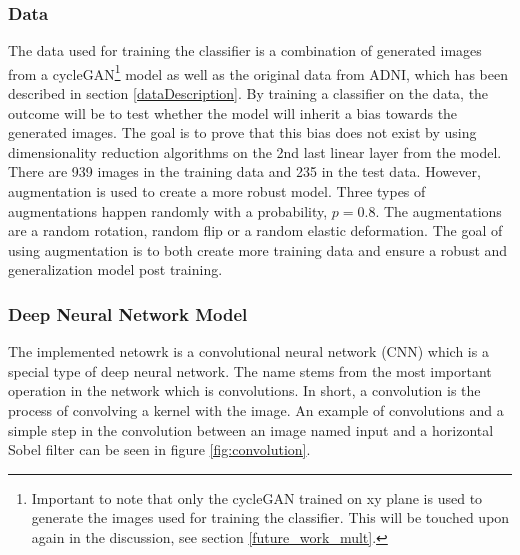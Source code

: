 \documentclass[12pt, fleqn, titlepage]{article}
\newcommand{\1}[1]{\mathds{1}\left[#1\right]}
\begin{document}
\subsubsection{Data}
The data used for training the classifier is a combination of generated images from a cycleGAN\footnote{Important to note that only the cycleGAN trained on xy plane is used to generate the images used for training the classifier. This will be touched upon again in the discussion, see section \ref{future_work_mult}.} model as well as the original data from ADNI, which has been described in section \ref{dataDescription}. By training a classifier on the data, the outcome will be to test whether the model will inherit a bias towards the generated images. The goal is to prove that this bias does not exist by using dimensionality reduction algorithms on the 2nd last linear layer from the model. There are 939 images in the training data and 235 in the test data. However, augmentation is used to create a more robust model. Three types of augmentations happen randomly with a probability, $ p = 0.8 $. The augmentations are a random rotation, random flip or a random elastic deformation. The goal of using augmentation is to both create more training data and ensure a robust and generalization model post training. 

\subsubsection{Deep Neural Network Model}

	The implemented netowrk is a convolutional neural network (CNN) which is a special type of deep neural network. The name stems from the most important operation in the network which is convolutions. In short, a convolution is the process of convolving a kernel with the image. An example of convolutions and a simple step in the convolution between an image named input and a horizontal Sobel filter can be seen in figure \ref{fig:convolution}.
	
\end{document}
